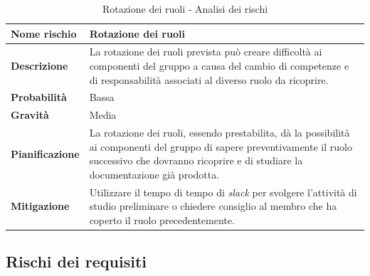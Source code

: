 \documentclass[12pt,a4paper]{article}
\begin{document}
\begin{table}[H]
\begin{center}
\begin{tabular}{p{} p{}}
\toprule
\textbf{Nome rischio} & \textbf{Rotazione dei ruoli} \\
\midrule
\midrule
\textbf{Descrizione} & La rotazione dei ruoli prevista può creare difficoltà ai componenti del gruppo a causa del cambio
di competenze e di responsabilità associati al diverso ruolo da ricoprire. \\
\midrule
\textbf{Probabilità} & Bassa \\
\midrule
\textbf{Gravità} & Media \\
\midrule
\textbf{Pianificazione} &  La rotazione dei ruoli, essendo prestabilita, dà la possibilità ai componenti del gruppo di sapere preventivamente il ruolo successivo che dovranno ricoprire e di studiare la documentazione già prodotta. \\
\midrule
\textbf{Mitigazione} & Utilizzare il tempo di tempo di \textit{slack} per svolgere l'attività di studio preliminare o chiedere consiglio al membro che ha coperto il ruolo precedentemente. \\
\bottomrule
\end{tabular}
\caption{Rotazione dei ruoli - Analisi dei rischi}
\end{center}
\end{table}

\subsection{Rischi dei requisiti}
\end{document}
